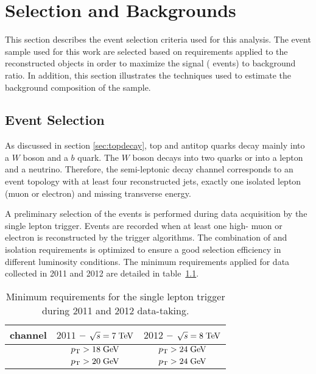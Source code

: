 \chapter{Selection and Backgrounds}
\label{sec:selection}

This section describes the event selection criteria used for this
analysis. The event sample used for this work are selected based on
requirements applied to the reconstructed objects in order to maximize
the signal (\ttbar{} events) to background ratio. In addition, this
section illustrates the techniques used to estimate the background
composition of the sample. 

\section{Event Selection}
\label{sec:evtsel}

As discussed in section \ref{sec:topdecay}, top and antitop quarks
decay mainly into a $W$ boson and a $b$ quark. The $W$ boson decays
into two quarks or into a lepton and a neutrino. Therefore, the
semi-leptonic decay channel corresponds to an event topology with at
least four reconstructed jets, exactly one isolated lepton (muon or
electron) and missing transverse energy.

A preliminary selection of the events is performed during data
acquisition by the single lepton trigger. Events are recorded when at
least one high-\pt{} muon or electron is reconstructed by the trigger
algorithms. 
The combination of \pt{} and isolation requirements is optimized to ensure
a good selection efficiency in different luminosity conditions. The
minimum \pt{} requirements applied for data collected in 2011 and 2012
are detailed in table~\ref{tab:trigthresholds}.

\begin{table}
  \caption{Minimum \pt{} requirements for the single lepton trigger during
  2011 and 2012 data-taking.}
  \label{tab:trigthresholds}
  \centering
  \begin{tabular}{lcc}
    \toprule
    channel & $2011$ -- $\sqrt{s} = 7 \; \mathrm{TeV}{}$ & $2012$ -- $\sqrt{s} = 8
    \; \mathrm{TeV}{}$ \\
    \midrule
    \mujets{}  & $p_{\mathrm{T}}{}>18 \; \mathrm{GeV}{}$    & $p_{\mathrm{T}}{}>24 \; \mathrm{GeV}{}$       \\
    \ejets{}     & $p_{\mathrm{T}}{}>20 \; \mathrm{GeV}{}$    & $p_{\mathrm{T}}{}>24 \; \mathrm{GeV}{}$       \\
    \bottomrule
  \end{tabular}
\end{table}

